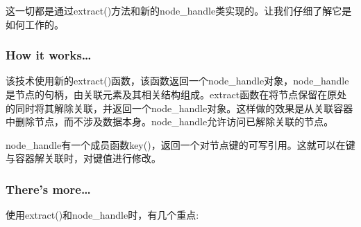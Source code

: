这一切都是通过extract()方法和新的node\_handle类实现的。让我们仔细了解它是如何工作的。

\subsubsection{How it works…}

该技术使用新的extract()函数，该函数返回一个node\_handle对象，node\_handle是节点的句柄，由关联元素及其相关结构组成。extract函数在将节点保留在原处的同时将其解除关联，并返回一个node\_handle对象。这样做的效果是从关联容器中删除节点，而不涉及数据本身。node\_handle允许访问已解除关联的节点。

node\_handle有一个成员函数key()，返回一个对节点键的可写引用。这就可以在键与容器解关联时，对键值进行修改。

\subsubsection{There's more…}

使用extract()和node\_handle时，有几个重点:

